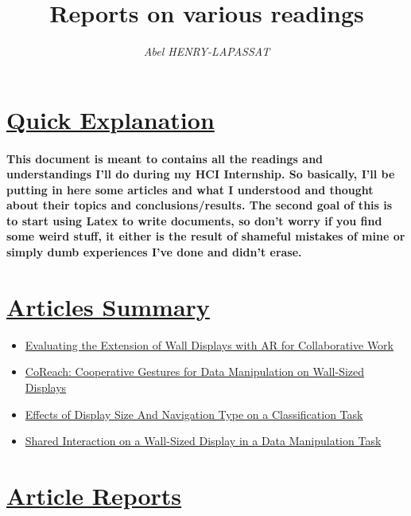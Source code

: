 \documentclass{article}
\title{\textbf{Reports on various readings}}
\author{\textit{Abel HENRY-LAPASSAT}}
\begin{document}
\maketitle
\section*{\underline{Quick Explanation}}
    \paragraph{ \textnormal{This document is meant to contains all the readings and understandings I'll do during my HCI Internship.
        So basically, I'll be putting in here some articles and what I understood and thought about their topics and conclusions/results.
        The second goal of this is to start using Latex to write documents, so don't worry if you find some weird stuff, it either is the
        result of shameful mistakes of mine or simply dumb experiences I've done and didn't erase. } }

\section*{\underline{Articles Summary}}
    \begin{itemize}
        \item \href{https://hal.science/hal-04010673/document}{Evaluating the Extension of Wall Displays with AR for Collaborative Work} \dotfill \pageref{sec:james2023}
        \item \href{https://hal.science/hal-01437091/document}{CoReach: Cooperative Gestures for Data Manipulation on Wall-Sized Displays} \dotfill \pageref{sec:liu2017}
        \item \href{https://hal.science/file/index/docid/957269/filename/chi14-classify-hal-v1.pdf}{Effects of Display Size And Navigation Type on a Classification Task} \dotfill \pageref{sec:liu2014}
        \item \href{https://inria.hal.science/hal-01275535/file/CHI16-sharedinteraction-halv1.pdf}{Shared Interaction on a Wall-Sized Display in a Data Manipulation Task} \dotfill \pageref{sec:liu2016}
    \end{itemize}

\section*{\underline{Article Reports}}

    \label{sec:james2023}
    
    \newpage 

    \label{sec:liu2017}
    
    \newpage

    \label{sec:liu2014}
    

    \label{sec:liu2016}
    
    
\end{document}
